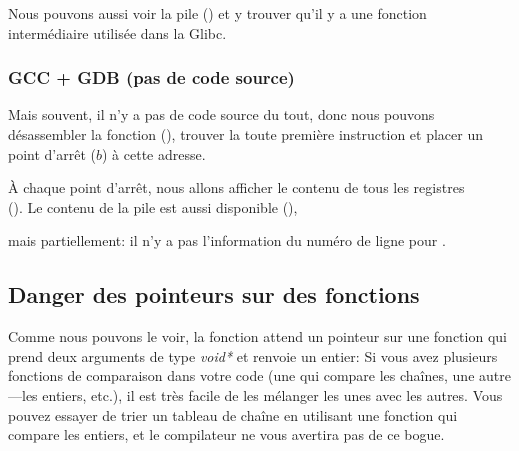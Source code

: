 Nous pouvons aussi voir la pile () et y trouver qu'il y a une fonction intermédiaire
 utilisée dans la Glibc.



\subsubsection{GCC + GDB (pas de code source)}

Mais souvent, il n'y a pas de code source du tout, donc nous pouvons désassembler
la fonction \comp (), trouver la toute première instruction \CMP et placer
un point d'arrêt ($b$) à cette adresse.

À chaque point d'arrêt, nous allons afficher le contenu de tous les registres\\
().
Le contenu de la pile est aussi disponible (),

mais partiellement: il n'y a pas l'information du numéro de ligne pour \comp.



\subsection{Danger des pointeurs sur des fonctions}

Comme nous pouvons le voir, la fonction \qsort attend un pointeur sur une fonction
qui prend deux arguments de type \emph{void*} et renvoie un entier:
Si vous avez plusieurs fonctions de comparaison dans votre code (une qui compare
les chaînes, une autre---les entiers, etc.), il est très facile de les mélanger les
unes avec les autres.
Vous pouvez essayer de trier un tableau de chaîne en utilisant une fonction qui compare
les entiers, et le compilateur ne vous avertira pas de ce bogue.


